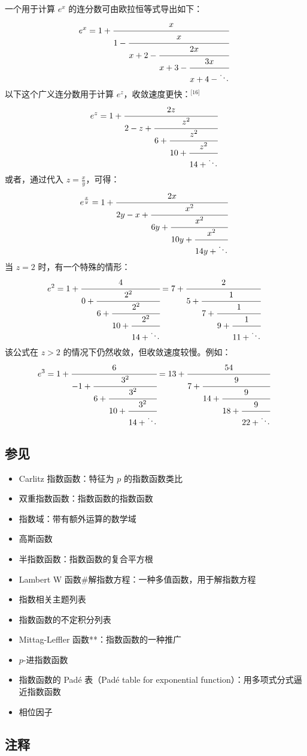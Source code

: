 一个用于计算 $e^x$ 的连分数可由欧拉恒等式导出如下：
$$
e^x = 1 + \cfrac{x}{1 - \cfrac{x}{x + 2 - \cfrac{2x}{x + 3 - \cfrac{3x}{x + 4 - \ddots}}}}~
$$
以下这个广义连分数用于计算 $e^z$，收敛速度更快：\(^\text{[16]}\)
$$
e^{z} = 1 + \cfrac{2z}{2 - z + \cfrac{z^2}{6 + \cfrac{z^2}{10 + \cfrac{z^2}{14 + \ddots}}}}~
$$
或者，通过代入 $z = \frac{x}{y}$，可得：
$$
e^{\frac{x}{y}} = 1 + \cfrac{2x}{2y - x + \cfrac{x^2}{6y + \cfrac{x^2}{10y + \cfrac{x^2}{14y + \ddots}}}}~
$$
当 $z = 2$ 时，有一个特殊的情形：
$$
e^2 = 1 + \cfrac{4}{0 + \cfrac{2^2}{6 + \cfrac{2^2}{10 + \cfrac{2^2}{14 + \ddots}}}} = 7 + \cfrac{2}{5 + \cfrac{1}{7 + \cfrac{1}{9 + \cfrac{1}{11 + \ddots}}}}~
$$
该公式在 $z > 2$ 的情况下仍然收敛，但收敛速度较慢。例如：
$$
e^3 = 1 + \cfrac{6}{-1 + \cfrac{3^2}{6 + \cfrac{3^2}{10 + \cfrac{3^2}{14 + \ddots}}}} = 13 + \cfrac{54}{7 + \cfrac{9}{14 + \cfrac{9}{18 + \cfrac{9}{22 + \ddots}}}}~
$$
\subsection{参见}
\begin{itemize}
\item Carlitz 指数函数：特征为 $p$ 的指数函数类比
\item 双重指数函数：指数函数的指数函数
\item 指数域：带有额外运算的数学域
\item 高斯函数
\item 半指数函数：指数函数的复合平方根
\item Lambert W 函数#解指数方程：一种多值函数，用于解指数方程
\item 指数相关主题列表
\item 指数函数的不定积分列表
\item Mittag-Leffler 函数**：指数函数的一种推广
\item $p$-进指数函数
\item 指数函数的 Padé 表（Padé table for exponential function）：用多项式分式逼近指数函数
\item 相位因子
\end{itemize}
\subsection{注释}
